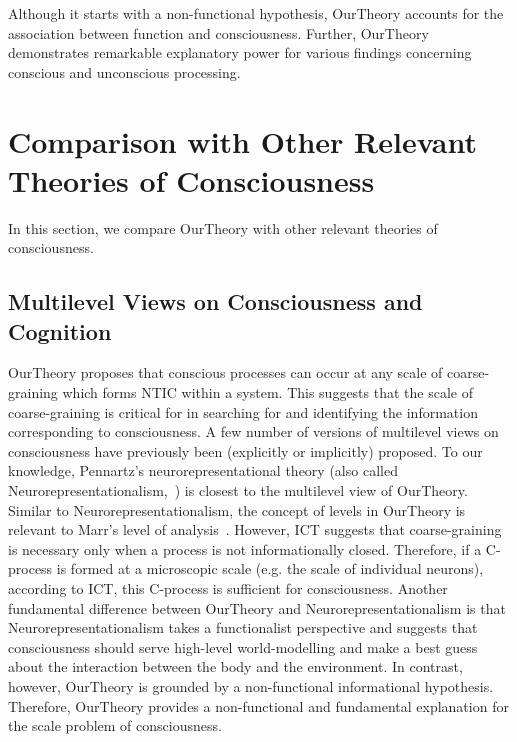 \documentclass[utf8]{article}
\begin{document}
    	    Although it starts with a non-functional hypothesis, \ac{OurTheory} accounts for the association between function and consciousness. Further, \ac{OurTheory}  demonstrates remarkable explanatory power for various findings concerning conscious and unconscious processing. 
	    
    \section{Comparison with Other Relevant Theories of Consciousness}\label{sec:Comparison with other theories}
    In this section, we compare \ac{OurTheory} with other relevant theories of consciousness.
	
	
        \subsection{Multilevel Views on Consciousness and Cognition}\label{sec:MultiLevelView}
    		\ac{OurTheory} proposes that conscious processes can occur at any scale of coarse-graining which forms NTIC within a system. This suggests that the scale of coarse-graining is critical for in searching for and identifying the information corresponding to consciousness. A few number of versions of multilevel views on consciousness have previously been (explicitly or implicitly) proposed. To our knowledge, Pennartz’s neurorepresentational theory (also called Neurorepresentationalism,~\citep{pennartz2018consciousness,pennartz2015brain}) is closest to the multilevel view of \ac{OurTheory}. Similar to Neurorepresentationalism, the concept of levels in \ac{OurTheory} is relevant to Marr's level of analysis~\citep{marr1982vision, pennartz2015brain, pennartz2018consciousness}. 
    		However, ICT suggests that coarse-graining is necessary only when a process is not informationally closed. Therefore, if a C-process is formed at a microscopic scale (e.g. the scale of individual neurons), according to ICT, this C-process is sufficient for consciousness.
    		Another fundamental difference between \ac{OurTheory} and Neurorepresentationalism is that Neurorepresentationalism takes a functionalist perspective and suggests that consciousness should serve high-level world-modelling and make a best guess about the interaction between the body and the environment. 
    		In contrast, however, \ac{OurTheory} is grounded by a non-functional informational hypothesis. Therefore, \ac{OurTheory} provides a non-functional and fundamental explanation for the scale problem of consciousness. 
    		
\end{document}
